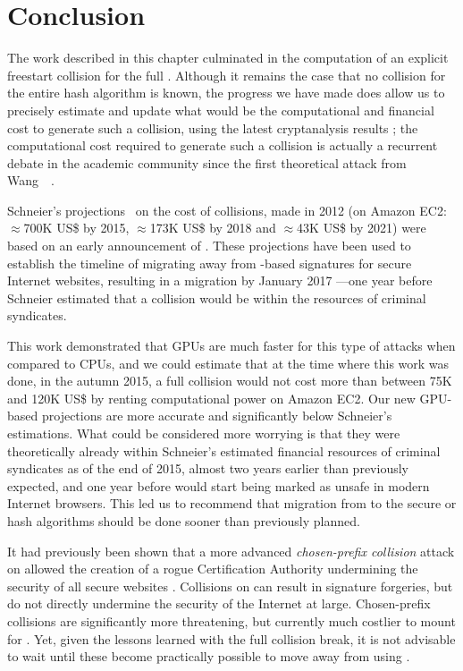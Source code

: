 \section{Conclusion}
\label{sec:conclusion}

The work described in this chapter culminated in the computation of an explicit freestart collision for the full \shaone. Although it remains the case that no collision for the entire hash algorithm is known,
the progress we have made does allow us to precisely estimate and update what would be the computational and financial cost to generate such a collision, using the latest cryptanalysis results \cite{DBLP:conf/eurocrypt/Stevens13};
the computational cost required to generate such a collision is actually a recurrent debate in the academic community since the first theoretical attack from Wang~\etal~\cite{DBLP:conf/crypto/WangYY05a}.

Schneier's projections~\cite{schneierSHA1} on the cost of \shaone collisions, made in 2012 (on Amazon EC2: $\approx$700K US\$ by 2015, $\approx$173K US\$ by 2018 and $\approx$43K US\$ by 2021) were based on
an early announcement of \cite{DBLP:conf/eurocrypt/Stevens13}. These projections have been used to establish the timeline of migrating away from \shaone-based signatures for secure Internet websites,
resulting in a migration by January 2017 ---one year before Schneier estimated that a \shaone collision would be within the resources of criminal syndicates. 

This work demonstrated that GPUs are much faster for this type of attacks when compared to CPUs,
and we could estimate that at the time where this work was done, in the autumn 2015, a full \shaone collision would not cost more than between 75K and 120K US\$ by renting computational power on Amazon EC2.
Our new GPU-based projections are more accurate and significantly below Schneier's estimations. What could be considered more worrying
is that they were theoretically already within Schneier's estimated financial resources of criminal syndicates as of the end of 2015,
almost two years earlier than previously expected, and one year before \shaone would start being marked as unsafe in modern Internet browsers.
This led us to recommend that migration from \shaone to the secure \shatwo or \shathree hash algorithms should be done sooner than previously planned.

It had previously been shown that a more advanced \emph{chosen-prefix collision} attack on \mdfive allowed the creation of a rogue Certification Authority undermining the security of all secure websites \cite{DBLP:conf/crypto/StevensSALMOW09}. 
Collisions on \shaone can result in \eg{} signature forgeries, but do not directly undermine the security of the Internet at large. Chosen-prefix collisions
are significantly more threatening, but currently much costlier to mount for \shaone. Yet, given the lessons learned with the \mdfive full collision break, it is not advisable to wait until these become practically possible
to move away from using \shaone.

